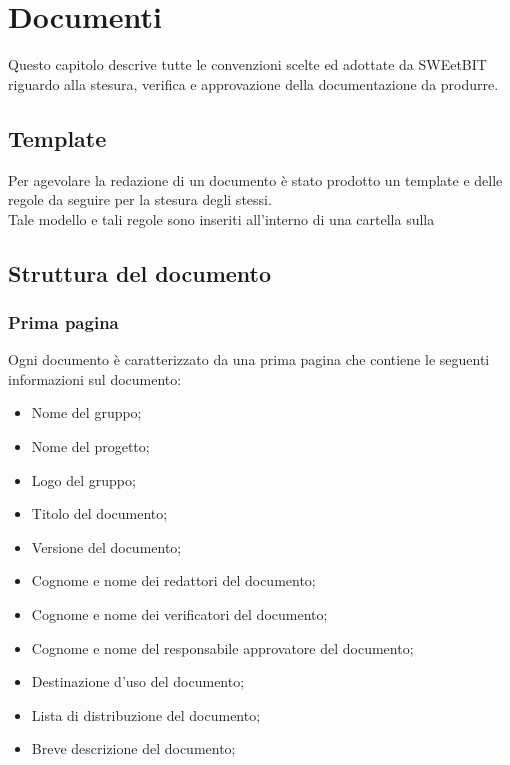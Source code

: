 \section{Documenti}
  Questo capitolo descrive tutte le convenzioni scelte ed adottate da SWEetBIT riguardo alla stesura, verifica e approvazione della documentazione da produrre.
  \subsection{Template}
    Per agevolare la redazione di un documento è stato prodotto un template e delle regole da seguire per la stesura degli stessi.\\
    Tale modello e tali regole sono inseriti all'interno di una cartella  sulla 
    \subsection{Struttura del documento}
      \subsubsection{Prima pagina}
        Ogni documento è caratterizzato da una prima pagina che contiene le seguenti informazioni sul documento:\\
        \begin{itemize}
          \item Nome del gruppo;
          \item Nome del progetto;
          \item Logo del gruppo;
          \item Titolo del documento;
          \item Versione del documento;
          \item Cognome e nome dei redattori del documento;
          \item Cognome e nome dei verificatori del documento;
          \item Cognome e nome del responsabile approvatore del documento;
          \item Destinazione d’uso del documento;
          \item Lista di distribuzione del documento;
          \item Breve descrizione del documento;
        \end{itemize}
